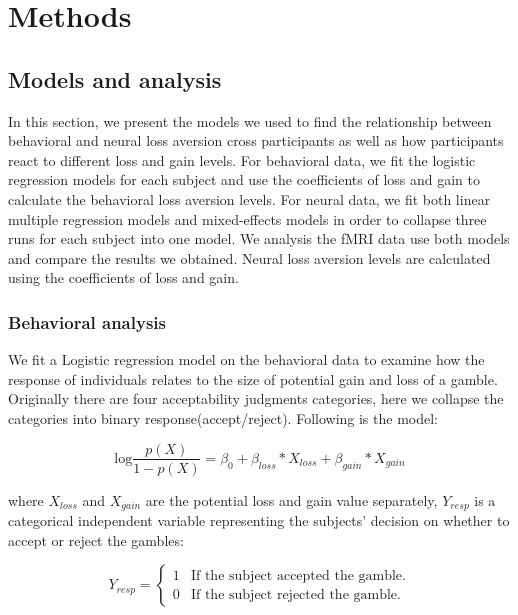 \section{Methods}

\subsection{Models and analysis}

In this section, we present the models we used to find the relationship between behavioral and neural loss aversion cross participants as well as how participants react to different loss and gain levels. For behavioral data, we fit the logistic regression models for each subject and use the coefficients of loss and gain to calculate the behavioral loss aversion levels. For neural data, we fit both linear multiple regression models and mixed-effects models in order to collapse three runs for each subject into one model. We analysis the fMRI data use both models and compare the results we obtained. Neural loss aversion levels are calculated using the coefficients of loss and gain. 

\subsubsection{Behavioral analysis}

We fit a Logistic regression model on the behavioral data to examine how the response of individuals relates to the size of potential gain and loss of a gamble. Originally there are four acceptability judgments categories, here we collapse the categories into binary response(accept/reject). Following is the model:

\begin{equation}
\textrm{log}\frac{p(X)}{1-p(X)} = \beta_0 + \beta_{loss} *X_{loss} + \beta_{gain} * X_{gain}
\end{equation}

where $X_{loss}$ and $X_{gain}$ are the potential loss and gain value separately, $Y_{resp}$ is a categorical independent variable representing the subjects' decision on whether to accept or reject the gambles:

\begin{displaymath}
Y_{resp} = \left \{ \begin{array}{ll}
1 & \textrm{If the subject accepted the gamble.} \\
0 & \textrm{If the subject rejected the gamble.}
\end{array} \right .
\end{displaymath}

